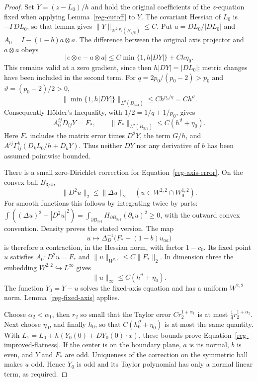 \begin{proof}
Set $Y=(z-L_0)/h$ and hold the original coefficients of the
$z$-equation fixed when applying Lemma~\ref{reg-cutoff} to $Y$.
The covariant Hessian of $L_0$ is $-\Gamma DL_0$, so that lemma
gives $\|Y\|_{W^{2,p_0}(B_{7/8})}\le C$. Put
$a=DL_0/|DL_0|$ and $A_0=I-(1-b)a\otimes a$.
The difference between the original axis projector and $a\otimes a$
obeys
\[
 |e\otimes e-a\otimes a|
       \le C\min\{1,h|DY|\}+Ch\eta_0.
\]
This remains valid at a zero gradient, since then $h|DY|=|DL_0|$;
metric changes have been included in the second term. For
$q=2p_0/(p_0-2)>p_0$ and $\vartheta=(p_0-2)/2>0$,
\[
 \|\min\{1,h|DY|\}\|_{L^q(B_{3/4})}
       \le C h^{p_0/q}=Ch^\vartheta.
\]
Consequently H\"older's Inequality, with $1/2=1/q+1/p_0$, gives
\begin{equation}
 A_0^{ij}D_{ij}Y=F_*,\qquad
 \|F_*\|_{L^2(B_{3/4})}\le C(h^\vartheta+\eta_0).
 \label{reg-axis-error}
\end{equation}
Here $F_*$ includes the matrix error times $D^2Y$, the term
$G/h$, and $A^{ij}\Gamma_{ij}^k(D_kL_0/h+D_kY)$.
Thus neither $DY$ nor any derivative of $b$ has been assumed
pointwise bounded.

There is a small zero-Dirichlet correction for
Equation~\eqref{reg-axis-error}. On the convex ball $B_{3/4}$,
\begin{equation}
 \|D^2u\|_2\le\|\Delta u\|_2
       \quad(u\in W^{2,2}\cap W^{1,2}_0).
 \label{reg-miranda-talenti}
\end{equation}
For smooth functions this follows by integrating twice by parts:
$\int((\Delta u)^2-|D^2u|^2)=
\int_{\partial B_{3/4}}H_{\partial B_{3/4}}(\partial_\nu u)^2\ge0$,
with the outward convex convention. Density proves the stated
version. The map
\[
 u\longmapsto\Delta_D^{-1}\bigl(F_*+(1-b)u_{aa}\bigr)
\]
is therefore a contraction, in the Hessian norm, with factor
$1-c_0$. Its fixed point $u$ satisfies $A_0:D^2u=F_*$ and
$\|u\|_{W^{2,2}}\le C\|F_*\|_2$. In dimension three the
embedding $W^{2,2}\hookrightarrow L^\infty$ gives
\[
 \|u\|_\infty\le C(h^\vartheta+\eta_0).
\]
The function $Y_0=Y-u$ solves the fixed-axis equation and has a
uniform $W^{2,2}$ norm. Lemma~\ref{reg-fixed-axis} applies.

Choose $\alpha_2<\alpha_1$, then $r_2$ so small that the Taylor
error $Cr_2^{1+\alpha_1}$ is at most
$\tfrac14r_2^{1+\alpha_2}$. Next choose $\eta_0$, and finally
$h_0$, so that $C(h_0^\vartheta+\eta_0)$ is at most the same
quantity. With
$L_1=L_0+h(Y_0(0)+DY_0(0)\cdot x)$, these bounds prove
Equation~\eqref{reg-improved-flatness}.
If the center is on the boundary plane, $a$ is its normal, $b$ is
even, and $Y$ and $F_*$ are odd. Uniqueness of the correction on
the symmetric ball makes $u$ odd. Hence $Y_0$ is odd and its
Taylor polynomial has only a normal linear term, as required.
\end{proof}

